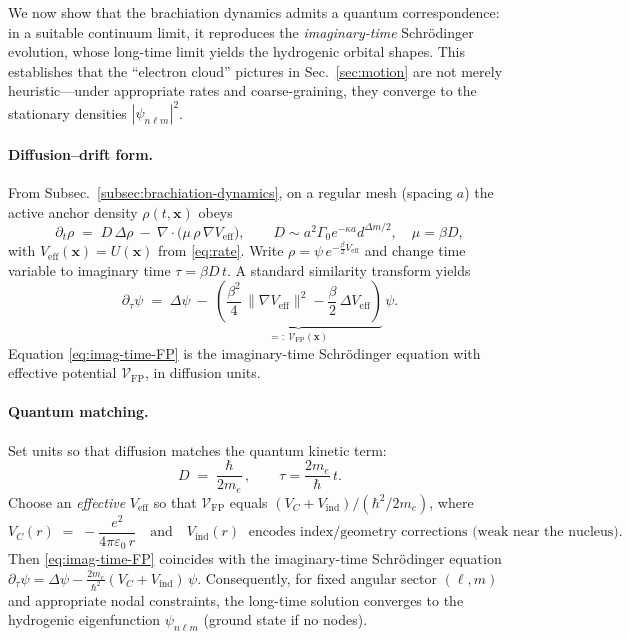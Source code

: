 \documentclass[11pt]{article}
\theoremstyle{plain}
\theoremstyle{definition}
\begin{document}
We now show that the brachiation dynamics admits a quantum correspondence: in a suitable continuum limit, it reproduces the \emph{imaginary-time} Schrödinger evolution, whose long-time limit yields the hydrogenic orbital shapes. This establishes that the ``electron cloud'' pictures in Sec.~\ref{sec:motion} are not merely heuristic—under appropriate rates and coarse-graining, they converge to the stationary densities $|\psi_{n\ell m}|^2$.

\paragraph{Diffusion--drift form.}
From Subsec.~\ref{subsec:brachiation-dynamics}, on a regular mesh (spacing $a$) the active anchor density $\rho(t,\mathbf{x})$ obeys
\begin{equation}
  \partial_t \rho
  \;=\;
  D\,\Delta \rho\ -\ \nabla\!\cdot\!\big(\mu\,\rho\,\nabla V_{\mathrm{eff}}\big),
  \qquad D \sim a^2 \Gamma_0 e^{-\kappa a} d^{\Delta m/2},\quad \mu = \beta D,
  \label{eq:fokker-planck}
\end{equation}
with $V_{\mathrm{eff}}(\mathbf{x}) = U(\mathbf{x})$ from \eqref{eq:rate}. Write $\rho = \psi\,e^{- \frac{\beta}{2} V_{\mathrm{eff}}}$ and change time variable to imaginary time $\tau = \beta D\, t$. A standard similarity transform yields
\begin{equation}
  \partial_\tau \psi
  \;=\;
  \Delta \psi\ -\ \underbrace{\left(\frac{\beta^2}{4}\,\|\nabla V_{\mathrm{eff}}\|^2 - \frac{\beta}{2}\,\Delta V_{\mathrm{eff}}\right)}_{=:~\mathcal{V}_{\mathrm{FP}}(\mathbf{x})}\, \psi.
  \label{eq:imag-time-FP}
\end{equation}
Equation \eqref{eq:imag-time-FP} is the imaginary-time Schrödinger equation with effective potential $\mathcal{V}_{\mathrm{FP}}$, in diffusion units.

\paragraph{Quantum matching.}
Set units so that diffusion matches the quantum kinetic term:
\[
  D \;=\; \frac{\hbar}{2 m_e}\,,\qquad \tau = \frac{2 m_e}{\hbar}\, t.
\]
Choose an \emph{effective} $V_{\mathrm{eff}}$ so that $\mathcal{V}_{\mathrm{FP}}$ equals $(V_C+V_{\mathrm{ind}})/(\hbar^2/2m_e)$, where
\[
  V_C(r) \;=\; -\frac{e^2}{4\pi\varepsilon_0\, r}
  \quad\text{and}\quad
  V_{\mathrm{ind}}(r) \;\text{ encodes index/geometry corrections (weak near the nucleus)}.
\]
Then \eqref{eq:imag-time-FP} coincides with the imaginary-time Schrödinger equation
\(
  \partial_\tau \psi = \Delta \psi - \frac{2 m_e}{\hbar^2}(V_C+V_{\mathrm{ind}})\,\psi.
\)
Consequently, for fixed angular sector $(\ell,m)$ and appropriate nodal constraints, the long-time solution converges to the hydrogenic eigenfunction $\psi_{n\ell m}$ (ground state if no nodes).
\end{document}
